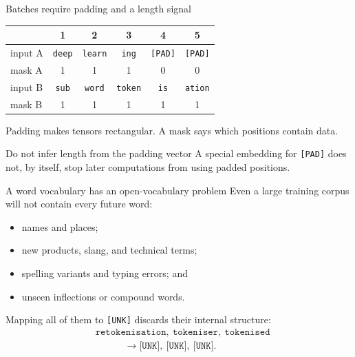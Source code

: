 \begin{frame}{Batches require padding and a length signal}
  \begin{center}
    \begin{tabular}{l|ccccc}
      & 1 & 2 & 3 & 4 & 5 \\ \hline
      input A & \texttt{deep} & \texttt{learn} & \texttt{ing} &
        \texttt{[PAD]} & \texttt{[PAD]} \\
      mask A  & 1 & 1 & 1 & 0 & 0 \\
      input B & \texttt{sub} & \texttt{word} & \texttt{token} &
        \texttt{is} & \texttt{ation} \\
      mask B  & 1 & 1 & 1 & 1 & 1
    \end{tabular}
  \end{center}

  Padding makes tensors rectangular. A mask says which positions contain data.

  \begin{alertblock}{Do not infer length from the padding vector}
    A special embedding for \texttt{[PAD]} does not, by itself, stop later
    computations from using padded positions.
  \end{alertblock}
\end{frame}

\begin{frame}{A word vocabulary has an open-vocabulary problem}
  Even a large training corpus will not contain every future word:
  \begin{itemize}
    \item names and places;
    \item new products, slang, and technical terms;
    \item spelling variants and typing errors; and
    \item unseen inflections or compound words.
  \end{itemize}

  Mapping all of them to \texttt{[UNK]} discards their internal structure:
  \[
    \begin{aligned}
      &\texttt{retokenisation},\ \texttt{tokeniser},\ \texttt{tokenised}\\
      &\hspace{3em}\longrightarrow
        \texttt{[UNK]},\ \texttt{[UNK]},\ \texttt{[UNK]}.
    \end{aligned}
  \]
\end{frame}

